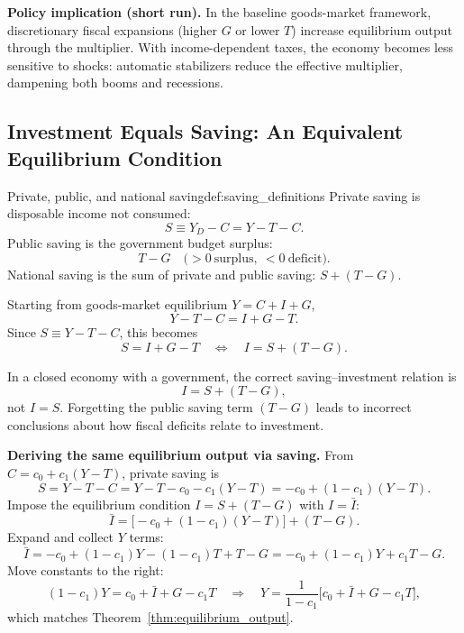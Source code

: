 \begin{policynote}
\textbf{Policy implication (short run).}
In the baseline goods-market framework, discretionary fiscal expansions (higher $G$ or lower $T$) increase equilibrium output through the multiplier.
With income-dependent taxes, the economy becomes less sensitive to shocks: automatic stabilizers reduce the effective multiplier, dampening both booms and recessions.
\end{policynote}

\subsection{Investment Equals Saving: An Equivalent Equilibrium Condition}

\begin{definition}{Private, public, and national saving}{def:saving_definitions}
Private saving is disposable income not consumed:
\[
S \equiv Y_D - C = Y - T - C.
\]
Public saving is the government budget surplus:
\[
T-G \quad \bigl(>0\ \text{surplus},\ <0\ \text{deficit}\bigr).
\]
National saving is the sum of private and public saving: $S + (T-G)$.
\end{definition}

\begin{keyformula}[title={Key Formula: Investment equals national saving (closed economy)}]
Starting from goods-market equilibrium $Y=C+I+G$,
\[
Y - T - C = I + G - T.
\]
Since $S \equiv Y-T-C$, this becomes
\[
S = I + G - T
\quad\Longleftrightarrow\quad
I = S + (T-G).
\]
\end{keyformula}

\begin{commonmistake}
In a closed economy with a government, the correct saving--investment relation is
\[
I = S + (T-G),
\]
not $I=S$.
Forgetting the public saving term $(T-G)$ leads to incorrect conclusions about how fiscal deficits relate to investment.
\end{commonmistake}

\noindent
\textbf{Deriving the same equilibrium output via saving.}
From $C=c_0+c_1(Y-T)$, private saving is
\[
S = Y - T - C
  = Y - T - c_0 - c_1(Y-T)
  = -c_0 + (1-c_1)(Y-T).
\]
Impose the equilibrium condition $I = S + (T-G)$ with $I=\bar I$:
\[
\bar I = \bigl[-c_0 + (1-c_1)(Y-T)\bigr] + (T-G).
\]
Expand and collect $Y$ terms:
\[
\bar I = -c_0 + (1-c_1)Y - (1-c_1)T + T - G
      = -c_0 + (1-c_1)Y + c_1T - G.
\]
Move constants to the right:
\[
(1-c_1)Y = c_0 + \bar I + G - c_1T
\quad\Rightarrow\quad
Y = \frac{1}{1-c_1}\bigl[c_0+\bar I+G-c_1T\bigr],
\]
which matches Theorem~\ref{thm:equilibrium_output}.

